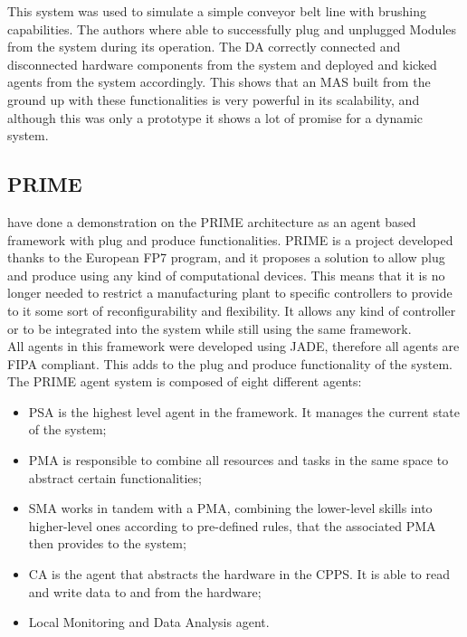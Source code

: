 This system was used to simulate a simple conveyor belt line with brushing capabilities. The authors where able to successfully plug and unplugged Modules from the system during its operation. The \acrshort{DA} correctly connected and disconnected hardware components from the system and deployed and kicked agents from the system accordingly. This shows that an \acrshort{MAS} built from the ground up with these functionalities is very powerful in its scalability, and although this was only a prototype it shows a lot of promise for a dynamic system.

\subsection{PRIME}

\citeauthor{PRIME_plug_and_produce} \cite{PRIME_plug_and_produce} have done a demonstration on the PRIME architecture as an agent based framework with plug and produce functionalities. PRIME is a project developed thanks to the European FP7 program, and it proposes a solution to allow plug and produce using any kind of computational devices. This means that it is no longer needed to restrict a manufacturing plant to specific controllers to provide to it some sort of reconfigurability and flexibility. It allows any kind of controller or to be integrated into the system while still using the same framework.\\

All agents in this framework were developed using \acrshort{JADE}, therefore all agents are \acrshort{FIPA} compliant. This adds to the plug and produce functionality of the system. The PRIME agent system is composed of eight different agents:
\begin{itemize}
	\item \acrfull{PSA} is the highest level agent in the framework. It manages the current state of the system;
	\item \acrfull{PMA} is responsible to combine all resources and tasks in the same space to abstract certain functionalities;
	\item \acrfull{SMA} works in tandem with a \acrshort{PMA}, combining the lower-level skills into higher-level ones according to pre-defined rules, that the associated \acrshort{PMA} then provides to the system;
	\item \acrfull{CA} is the agent that abstracts the hardware in the \acrshort{CPPS}. It is able to read and write data to and from the hardware;
	\item Local Monitoring and Data Analysis agent.
\end{itemize}

